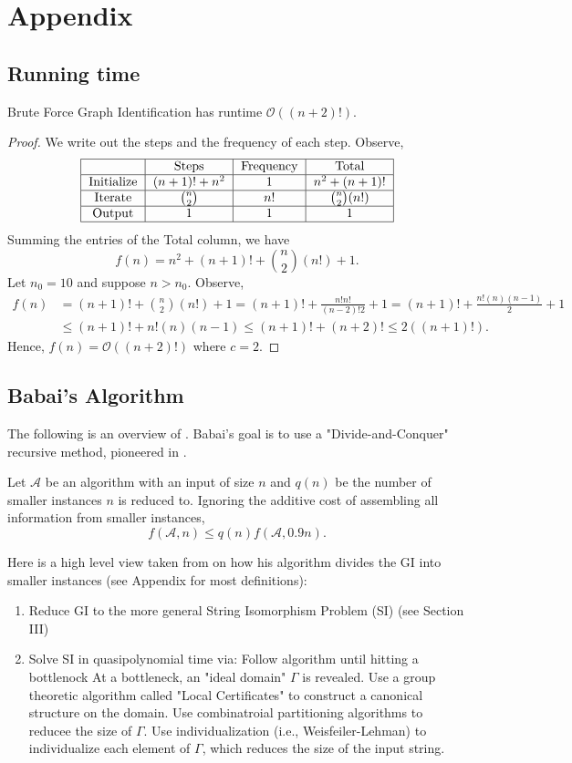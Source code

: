 \section{Appendix}
\subsection{Running time}
\begin{theorem}
	Brute Force Graph Identification has runtime $\mathcal{O}((n+2)!)$.
\end{theorem}
\begin{proof}
	We write out the steps and the frequency of each step. Observe,
	\[\begin{tabular}{|c|c|c|c|}
		\hline
		& Steps&Frequency&Total\\
		\hline
		Initialize&$(n+1)!+n^2$&1&$n^2+(n+1)!$\\
		\hline
		Iterate&${n\choose 2}$&$n!$&${n\choose2}(n!)$\\
		\hline
		Output&1&1&1\\
		\hline
	\end{tabular}\]
	Summing the entries of the Total column, we have\[f(n)=n^2+(n+1)!+{n\choose2}(n!)+1.\]
	Let $n_0=10$ and suppose $n>n_0$. Observe,
	\begin{align*}
		f(n)&=(n+1)!+{n\choose2}(n!)+1=(n+1)!+\frac{n!n!}{(n-2)!2}+1=(n+1)!+\frac{n!(n)(n-1)}{2}+1\\
		&\le(n+1)!+n!(n)(n-1)\le(n+1)!+(n+2)!\le2((n+1)!).
	\end{align*}
	Hence, $f(n)=\mathcal{O}((n+2)!)$ where $c=2$.
\end{proof}
\subsection{Babai's Algorithm}
The following is an overview of \cite{babai2016,babai2018}. Babai's goal is to use a "Divide-and-Conquer" recursive method, pioneered in \cite{luks1982}. 
\begin{definition}
	Let $\mathcal{A}$ be an algorithm with an input of size $n$ and $q(n)$ be the number of smaller instances $n$ is reduced to. Ignoring the additive cost of assembling all information from smaller instances,
	\[f(\mathcal{A},n)\le q(n)f(\mathcal{A},0.9n).\] 
\end{definition}
Here is a high level view taken from \cite{babai2018,babai2016} on how his algorithm divides the GI into smaller instances (see Appendix for most definitions):
\begin{enumerate}
	\item Reduce GI to the more general String Isomorphism Problem (SI) (see Section III)
	\item Solve SI in quasipolynomial time via:
	 Follow \cite{luks1982} algorithm until hitting a bottlenock
	 At a bottleneck, an "ideal domain" $\Gamma$ is revealed. 
	Use a group theoretic algorithm called "Local Certificates" to construct a canonical structure on the domain.
	 Use combinatroial partitioning algorithms to reducee the size of $\Gamma$.
	 Use individualization (i.e., Weisfeiler-Lehman) to individualize each element of $\Gamma$, which reduces the size of the input string.
\end{enumerate}